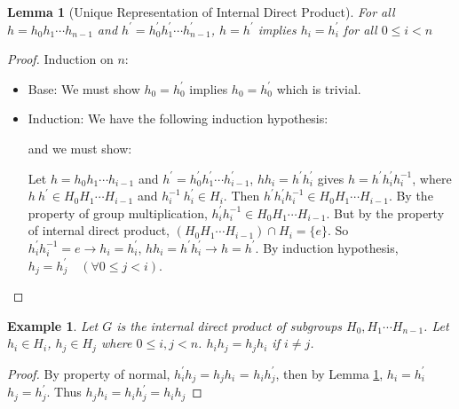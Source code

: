 \documentclass[14pt]{extarticle}
\newtheorem{lemma}{Lemma}[section]
\newtheorem*{example}{Example}
\newcommand{\inv}[1]{#1^{-1}}
\begin{document}
\begin{lemma}[Unique Representation of Internal Direct Product]
  \label{lemma9.2}
  For all $h = h_0h_1 \cdots h_{n - 1}$ and $h^\prime = h_0^\prime h_1^\prime \cdots h_{n - 1}^\prime$,
  $h = h^\prime$ implies $h_i = h_i^\prime$ for all $0 \le i < n$
\end{lemma}
\begin{proof}
  Induction on $n$:
  \begin{itemize}
    \item Base: We must show $h_0 = h_0^\prime$ implies $h_0 = h_0^\prime$ which is trivial.
    \item Induction: We have the following induction hypothesis:
      \begin{center}
      \end{center}
      and we must show:
      \begin{center}
      \end{center}

      Let $h = h_0h_1 \cdots h_{i - 1}$ and $h^\prime = h_0^\prime h_1^\prime \cdots h_{i - 1}^\prime$,
      $hh_i = h^\prime h_i^\prime$ gives $h = h^\prime h_i^\prime \inv{h_i}$,
      where $h \ h^\prime \in H_0H_1 \cdots H_{i - 1}$ and $\inv{h_i} \ h_i^\prime \in H_i$.
      Then $h^\prime h_i^\prime \inv{h_i} \in H_0H_1 \cdots H_{i - 1}$.
      By the property of group multiplication, $h_i^\prime \inv{h_i} \in H_0H_1 \cdots H_{i - 1}$.
      But by the property of internal direct product, $(H_0H_1 \cdots H_{i - 1}) \cap H_i = \{ e \}$.
      So $h_i^\prime \inv{h_i} = e \rightarrow h_i = h_i^\prime$, 
      $hh_i = h^\prime h_i^\prime \rightarrow h = h^\prime$.
      By induction hypothesis, $h_j = h_j^\prime \quad (\forall 0 \le j < i)$.
  \end{itemize}
\end{proof}

\begin{example}
  Let $G$ is the internal direct product of subgroups $H_0, H_1 \cdots H_{n - 1}$.
  Let $h_i \in H_i$, $h_j \in H_j$ where $0 \le i, j < n$. $h_ih_j = h_jh_i$ if $i \neq j$.
\end{example}
\begin{proof}
  By property of normal, $h_i^\prime h_j = h_jh_i$ = $h_ih_j^\prime$,
  then by Lemma \ref{lemma9.2}, $h_i = h_i^\prime$ $h_j = h_j^\prime$.
  Thus $h_jh_i = h_ih_j^\prime = h_i h_j$
\end{proof}
\end{document}
